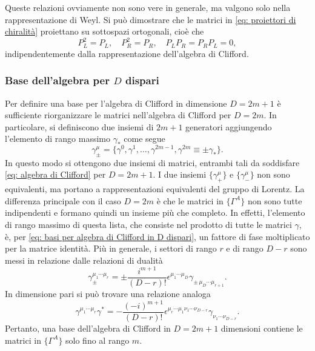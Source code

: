 Queste relazioni ovviamente non sono vere in generale, ma valgono solo nella rappresentazione di Weyl. Si può dimostrare che le matrici in \eqref{eq: proiettori di chiralità} proiettano su sottospazi ortogonali, cioè che 
\begin{equation}
    P_L^2 = P_L,\quad P_R^2 = P_R,\quad P_LP_R = P_RP_L = 0,
\end{equation}
indipendentemente dalla rappresentazione dell'algebra di Clifford. 

\subsubsection{Base dell'algebra per \texorpdfstring{$D$}{D} dispari}
Per definire una base per l'algebra di Clifford in dimensione $D = 2m + 1$ è sufficiente riorganizzare le matrici nell'algebra di Clifford per $D = 2m$. In particolare, si definiscono due insiemi di $2m + 1$ generatori aggiungendo l'elemento di rango massimo $\gamma_*$ come segue 
\begin{equation}
\label{eq: basi per algebra di Clifford in D dispari}
    \gamma_\pm^\mu = \{\gamma^0,\gamma^1,\dots,\gamma^{2m - 1},\gamma^{2m} \equiv \pm\gamma_*\}.
\end{equation}
In questo modo si ottengono due insiemi di matrici, entrambi tali da soddisfare \eqref{eq: algebra di Clifford} per $D = 2m + 1$. I due insiemi $\{\gamma^\mu_+\}$ e $\{\gamma^\mu_-\}$ non sono equivalenti, ma portano a rappresentazioni equivalenti del gruppo di Lorentz. La differenza principale con il caso $D = 2m$ è che le matrici in $\{\Gamma^A\}$ non sono tutte indipendenti e formano quindi un insieme più che completo. In effetti, l'elemento di rango massimo di questa lista, che consiste nel prodotto di tutte le matrici $\gamma$, è, per \eqref{eq: basi per algebra di Clifford in D dispari}, un fattore di fase moltiplicato per la matrice identità. Più in generale, i settori di rango $r$ e di rango $D - r$ sono messi in relazione dalle relazioni di dualità 
\begin{equation}
    \gamma_\pm^{\mu_1\cdots\mu_r} = \pm\frac{i^{m + 1}}{(D - r)!}\epsilon^{\mu_1\cdots\mu_D}\gamma_{\pm\,\mu_D\cdots\mu_{r + 1}}.
\end{equation}
In dimensione pari si può trovare una relazione analoga
\begin{equation}
    \gamma^{\mu_1\cdots \mu_r}\gamma^* = -\frac{(-i)^{m + 1}}{(D - r)!}\epsilon^{\mu_r\cdots\mu_1\nu_1\cdots\nu_{D - r}}\gamma_{\nu_1\cdots \nu_{D - r}}.
\end{equation}
Pertanto, una base dell'algebra di Clifford in $D = 2m + 1$ dimensioni contiene le matrici in $\{\Gamma^A\}$ solo fino al rango $m$.

